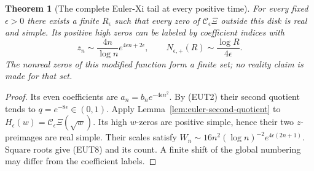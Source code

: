 \documentclass[11pt]{article}
\newtheorem{theorem}{Theorem}
\theoremstyle{remark}\newtheorem{remark}[theorem]{Remark}
\begin{document}
\begin{theorem}[The complete Euler-Xi tail at every positive time]
\label{thm:euler-xi-tail}
For every fixed $\epsilon>0$ there exists a finite $R_\epsilon$
such that every zero of $\mathcal C_\epsilon\Xi$ outside this
disk is real and simple. Its positive high zeros can be labeled
by coefficient indices with
\[
 z_n\sim\frac{4n}{\log n}e^{4\epsilon n+2\epsilon},
 \qquad N_{\epsilon,+}(R)\sim\frac{\log R}{4\epsilon}.    \tag{EUT8}
\]
The nonreal zeros of this modified function form a finite set;
no reality claim is made for that set.
\end{theorem}
\begin{proof}
Its even coefficients are $a_n=b_ne^{-4\epsilon n^2}$.
By (EUT2) their second quotient tends to
$q=e^{-8\epsilon}\in(0,1)$.
Apply Lemma~\ref{lem:euler-second-quotient} to
$H_\epsilon(w)=\mathcal C_\epsilon\Xi(\sqrt w)$.
Its high $w$-zeros are positive simple, hence their two
$z$-preimages are real simple.
Their scales satisfy
$W_n\sim16n^2(\log n)^{-2}e^{4\epsilon(2n+1)}$.
Square roots give (EUT8) and its count.
A finite shift of the global numbering may differ from the
coefficient labels.
\end{proof}
\end{document}
